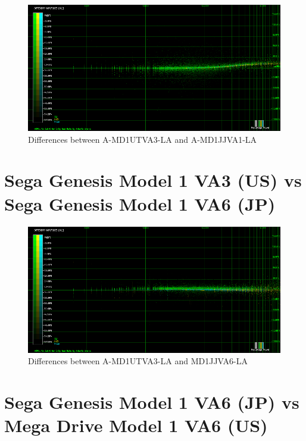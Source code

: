 \documentclass[10pt,a4paper]{report}
\begin{document}
\begin{figure}[H]
	\centering
	\includegraphics[width=1.0\linewidth]{images/results/1-A-MD1UTVA3-LA_vs_A-MD1JJVA1_LA.png}
	\caption[A-MD1UTVA3-LA vs A-MD1JJVA1-LA]{Differences between A-MD1UTVA3-LA and A-MD1JJVA1-LA}
	\label{fig:A-MD1UTVA3-LA_vs_A-MD1JJVA1_LA}
\end{figure}

\section{Sega Genesis Model 1 VA3 (US) vs\\ Sega Genesis Model 1 VA6 (JP)}

\begin{figure}[H]
	\centering
	\includegraphics[width=1.0\linewidth]{images/results/2-A-MD1UTVA3-LA_vs_A-MD1JJVA6_LA.png}
	\caption[A-MD1UTVA3-LA vs A-MD1JJVA6-LA]{Differences between A-MD1UTVA3-LA and MD1JJVA6-LA}
	\label{fig:A-MD1UTVA3-LA_vs_A-MD1JJVA6_LA}
\end{figure}

\section{Sega Genesis Model 1 VA6 (JP) vs\\ Mega Drive Model 1 VA6 (US)}
\end{document}
